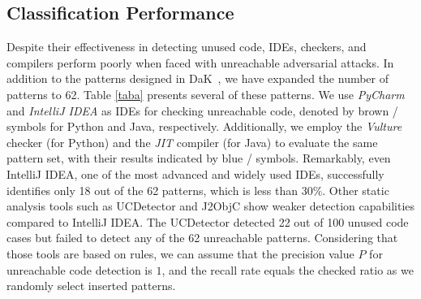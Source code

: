 \documentclass[11pt]{article}
\begin{document}



\subsection{Classification Performance}
\label{unreach}


Despite their effectiveness in detecting unused code, IDEs, checkers, and compilers perform poorly when faced with unreachable adversarial attacks. In addition to the patterns designed in DaK~\cite{gao2023discrete}, we have expanded the number of patterns to 62. Table \ref{taba} presents several of these patterns. We use \textit{PyCharm} and \textit{IntelliJ IDEA} as IDEs for checking unreachable code, denoted by brown {\textcolor{brown}{}}/{\textcolor{brown}{}} symbols for Python and Java, respectively. Additionally, we employ the \textit{Vulture} checker (for Python) and the \textit{JIT} compiler (for Java) to evaluate the same pattern set, with their results indicated by blue {\textcolor{darkblue}{}}/{\textcolor{darkblue}{}} symbols. Remarkably, even IntelliJ IDEA, one of the most advanced and widely used IDEs, successfully identifies only 18 out of the 62 patterns, which is less than 30\%. Other static analysis tools such as UCDetector and J2ObjC show weaker detection capabilities compared to IntelliJ IDEA. The UCDetector detected 22 out of 100 unused code cases but failed to detect any of the 62 unreachable patterns.
Considering that those tools are based on rules, we can assume that the precision value $P$ for unreachable code detection is $1$, and the recall rate equals the checked ratio as we randomly select inserted patterns.
\end{document}

